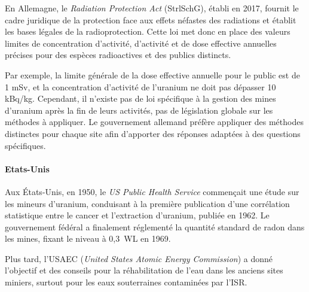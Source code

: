 \documentclass{article}
\begin{document}
En Allemagne, le \emph{Radiation Protection Act} (StrlSchG), établi en 2017, fournit le cadre juridique de la protection face aux effets néfastes des radiations et établit les bases légales de la radioprotection.
Cette loi met donc en place des valeurs limites de concentration d’activité, d’activité et de dose effective annuelles précises pour des espèces radioactives et des publics distincts. 

Par exemple, la limite générale de la dose effective annuelle pour le public est de 1 mSv, et la concentration d’activité de l’uranium ne doit pas dépasser 10 kBq/kg. Cependant, il n’existe pas de loi spécifique à la gestion des mines d’uranium après la fin de leurs activités, pas de législation globale sur les méthodes à appliquer. Le gouvernement allemand préfère appliquer des méthodes distinctes pour chaque site afin d’apporter des réponses adaptées à des questions spécifiques.


\paragraph{Etats-Unis}

Aux États-Unis, en 1950, le \textit{US Public Health Service} commençait une étude sur les mineurs d'uranium, conduisant à la première publication d'une corrélation statistique entre le cancer et l'extraction d'uranium, publiée en 1962. Le gouvernement fédéral a finalement réglementé la quantité standard de radon dans les mines, fixant le niveau à 0,3~WL en 1969.

Plus tard, l'USAEC (\textit{United States Atomic Energy Commission}) a donné l’objectif et des conseils pour la réhabilitation de l’eau dans les anciens sites miniers, surtout pour les eaux souterraines contaminées par l'ISR.
\end{document}
